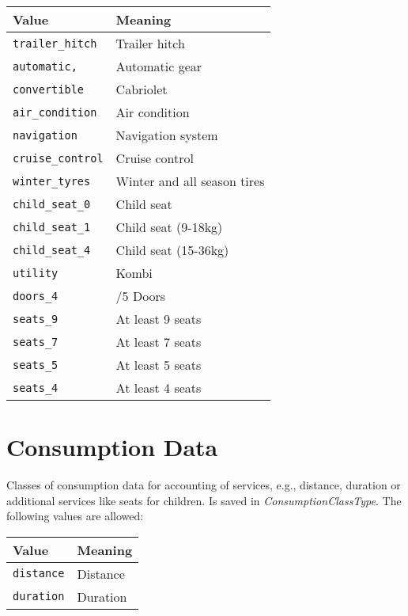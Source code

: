 \begin{flushleft}
\begin{tabularx}{\linewidth}{l>{\raggedright\arraybackslash}X}
\toprule
Value & Meaning\\
\midrule
\verb|trailer_hitch| & Trailer hitch\\
\verb|automatic,| & Automatic gear\\
\verb|convertible| & Cabriolet\\
\verb|air_condition| & Air condition\\
\verb|navigation| & Navigation system\\
\verb|cruise_control| & Cruise control\\
\verb|winter_tyres| & Winter and all season tires\\
\verb|child_seat_0| & Child seat\\
\verb|child_seat_1| & Child seat (9-18kg)\\
\verb|child_seat_4| & Child seat (15-36kg)\\
\verb|utility| & Kombi\\
\verb|doors_4| & 4/5 Doors\\
\verb|seats_9| & At least 9 seats\\
\verb|seats_7| & At least 7 seats\\
\verb|seats_5| & At least 5 seats\\
\verb|seats_4| & At least 4 seats\\
\bottomrule
\end{tabularx}
\end{flushleft}

\section{Consumption Data}
\label{sec:CodeTabellen:ConsumptionClassType}
Classes of consumption data for accounting of services, e.g., distance, duration or additional services like seats for children. Is saved in \emph{ConsumptionClassType}. The following values are allowed: 

\begin{flushleft}
\begin{tabularx}{\linewidth}{l>{\raggedright\arraybackslash}X}
\toprule
Value & Meaning\\
\midrule
\verb|distance| & Distance\\
\verb|duration| & Duration\\
\bottomrule
\end{tabularx}
\end{flushleft}


